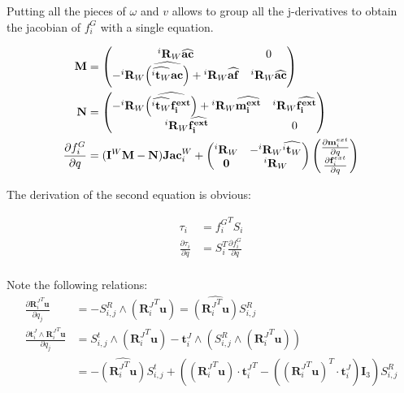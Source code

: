 Putting all the pieces of $\omega$ and $v$ allows to group all the j-derivatives to obtain the jacobian of $f^G_i$ with a single equation.

\begin{align}
  \bf M &=
  \begin{pmatrix}
    {}^i\mathbf{R}_W \widehat{\bf ac}  & 0\\
    -{{}^i\mathbf{R}_W}\widehat{\left(\widehat{{}^i\mathbf{t}_W}\bf ac \right)}
    + {}^i\mathbf{R}_W \widehat{\bf af}  & {{}^i\mathbf{R}_W}\widehat{\bf ac} \\
  \end{pmatrix}
  \\
  \bf N &=
  \begin{pmatrix}
    - {{}^i\mathbf{R}_W}\widehat{\left(\widehat{{}^i\mathbf{t}_W}\bf \mathbf{f}^{ext}_i \right)} + {}^i\mathbf{R}_W \widehat{\bf \mathbf{m}^{ext}_i} & {{}^i\mathbf{R}_W}\widehat{\bf \mathbf{f}^{ext}_i} \\
    {}^i\mathbf{R}_W \widehat{\bf \mathbf{f}^{ext}_i} & 0\\
  \end{pmatrix}
  \\
  \frac{\partial f^G_i}{\partial q} &= (\mathbf{I}^W \mathbf{M} - \mathbf{N})\mathbf{Jac}^W_i
  +
  \begin{pmatrix}
    {{}^i\mathbf{R}_W} & -{{}^i\mathbf{R}_W}\widehat{{}^i\mathbf{t}_W} \\
    \mathbf{0} & {{}^i\mathbf{R}_W} \\
  \end{pmatrix}
  \begin{pmatrix}
    \frac{\partial \mathbf{m}^{ext}_i}{\partial q} \\ \frac{\partial \mathbf{f}^{ext}_i}{\partial q}
  \end{pmatrix}
\end{align}

The derivation of the second equation is obvious:

\begin{align}
  \tau_i &= {f^G_i}^T S_i \\
  \frac{\partial \tau_i}{\partial q} &= S_i^T \frac{\partial f^G_i}{\partial q} \\
\end{align}

Note the following relations:
\begin{align}
  \frac{\partial {\mathbf{R}_i^J}^T \mathbf{u}}{\partial q_j}
  &= - S^R_{i,j} \wedge ({\mathbf{R}_i^J}^T \mathbf{u})
  = \widehat{({\mathbf{R}_i^J}^T \mathbf{u})} S^R_{i,j}
  \\
  \frac{\partial\mathbf{t}^J_i\wedge {\mathbf{R}_i^J}^T  \mathbf{u}}{\partial q_j}
  &= S^t_{i,j} \wedge \left({\mathbf{R}_i^J}^T \mathbf{u}\right)
  - \mathbf{t}^J_i \wedge \left( S^R_{i,j} \wedge \left({\mathbf{R}_i^J}^T \mathbf{u}\right)\right) \\
  &= -\widehat{({\mathbf{R}_i^J}^T \mathbf{u})} S^t_{i,j}
  + \left(\left({\mathbf{R}_i^J}^T \mathbf{u}\right) \cdot {\mathbf{t}^J_i}^T
  - \left( {({\mathbf{R}_i^J}^T \mathbf{u})}^T \cdot \mathbf{t}^J_i\right) \mathbf{I}_3\right)S_{i,j}^R\\
\end{align}

